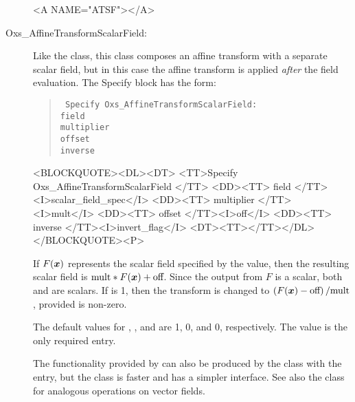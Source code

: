 \begin{description}
\begin{rawhtml}<A NAME="ATSF"></A>\end{rawhtml}%
%
\item[Oxs\_AffineTransformScalarField:\label{item:AffineTransformScalarField}]
Like the  class, this class composes
an affine transform with a separate scalar field, but in this case the
affine transform is applied \textit{after} the field evaluation.
The Specify block has the form:
\begin{latexonly}
\begin{quote}\tt
Specify Oxs\_AffineTransformScalarField: \ocb\\
 \bi field \\
 \bi multiplier \\
 \bi offset \\
 \bi inverse \\
\ccb
\end{quote}
\end{latexonly}
\begin{rawhtml}<BLOCKQUOTE><DL><DT>
<TT>Specify Oxs_AffineTransformScalarField {</TT>
<DD><TT> field </TT><I>scalar_field_spec</I>
<DD><TT> multiplier </TT><I>mult</I>
<DD><TT> offset </TT><I>off</I>
<DD><TT> inverse </TT><I>invert_flag</I>
<DT><TT>}</TT></DL></BLOCKQUOTE><P>
\end{rawhtml}
If $F(\mbox{\boldmath$x$})$ represents the scalar field specified by the
 value, then the resulting scalar field is
$\textrm{mult}*F(\mbox{\boldmath$x$})+\textrm{off}$.  Since the output
from $F$ is a scalar, both  and 
are scalars.  If  is 1, then the transform is changed
to $\left(F(\mbox{\boldmath$x$})-\textrm{off}\right)/\textrm{mult}$,
provided  is non-zero.

The default values for , , and
 are 1, 0, and 0, respectively.  The 
value is the only required entry.

The functionality provided by  can
also be produced by the
class with the
 entry, but the 
class is faster and has a simpler interface.  See also the
class for analogous
operations on vector fields.


\end{description}
